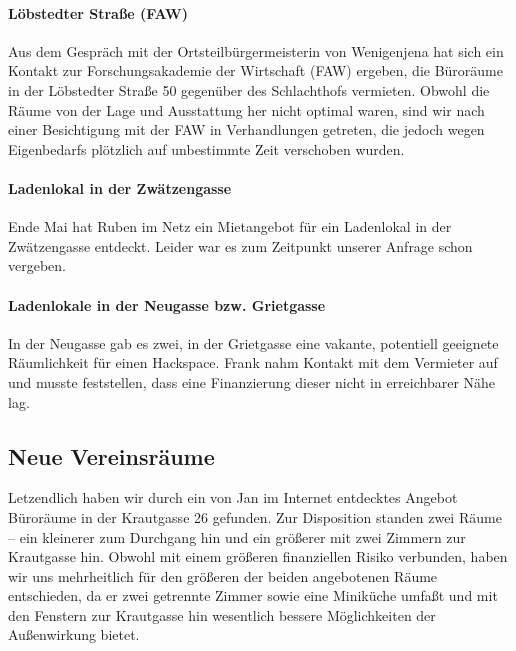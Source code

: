 \documentclass[10pt,DIV16]{scrartcl}
\begin{document}
\paragraph{Löbstedter Straße (FAW)}

Aus dem Gespräch mit der Ortsteilbürgermeisterin von Wenigenjena hat sich ein
Kontakt zur Forschungsakademie der Wirtschaft (FAW) ergeben, die Büroräume in
der Löbstedter Straße 50 gegenüber des Schlachthofs vermieten.  Obwohl die
Räume von der Lage und Ausstattung her nicht optimal waren, sind wir nach
einer Besichtigung mit der FAW in Verhandlungen getreten, die jedoch wegen
Eigenbedarfs plötzlich auf unbestimmte Zeit verschoben wurden.

\paragraph{Ladenlokal in der Zwätzengasse}

Ende Mai hat Ruben im Netz ein Mietangebot für ein Ladenlokal in der
Zwätzengasse entdeckt.  Leider war es zum Zeitpunkt unserer Anfrage schon
vergeben.

\paragraph{Ladenlokale in der Neugasse bzw. Grietgasse}

In der Neugasse gab es zwei, in der Grietgasse eine vakante,
potentiell geeignete Räumlichkeit für einen Hackspace. Frank nahm
Kontakt mit dem Vermieter auf und musste feststellen, dass eine
Finanzierung dieser nicht in erreichbarer Nähe lag.

\subsection{Neue Vereinsräume}

Letzendlich haben wir durch ein von Jan im Internet entdecktes Angebot
Büroräume in der Krautgasse 26 gefunden.  Zur Disposition standen zwei Räume
-- ein kleinerer zum Durchgang hin und ein größerer mit zwei Zimmern zur
Krautgasse hin.  Obwohl mit einem größeren finanziellen Risiko verbunden,
haben wir uns mehrheitlich für den größeren der beiden angebotenen Räume
entschieden, da er zwei getrennte Zimmer sowie eine Miniküche umfaßt und mit
den Fenstern zur Krautgasse hin wesentlich bessere Möglichkeiten der
Außenwirkung bietet.
\end{document}
